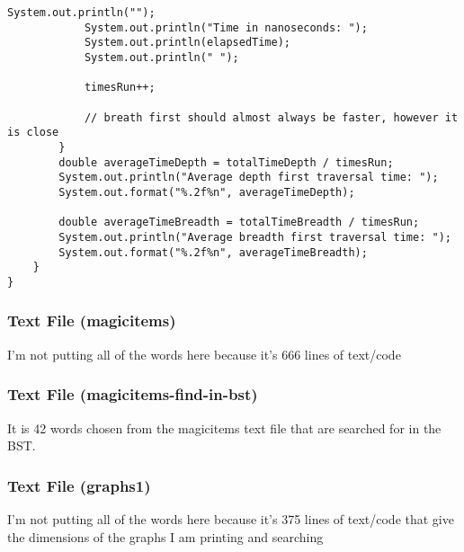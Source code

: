 \documentclass[10pt]{article}
\begin{document}
\begin{lstlisting}[frame=single, ]
            System.out.println("");
            System.out.println("Time in nanoseconds: ");
            System.out.println(elapsedTime);
            System.out.println(" ");

            timesRun++;

            // breath first should almost always be faster, however it is close
        }
        double averageTimeDepth = totalTimeDepth / timesRun;
        System.out.println("Average depth first traversal time: ");
        System.out.format("%.2f%n", averageTimeDepth);

        double averageTimeBreadth = totalTimeBreadth / timesRun;
        System.out.println("Average breadth first traversal time: ");
        System.out.format("%.2f%n", averageTimeBreadth);
    }
}
\end{lstlisting}


\subsubsection{Text File (magicitems)}
\lstset{numbers=left, numberstyle=\tiny, stepnumber=1, numbersep=5pt, basicstyle=\footnotesize\ttfamily}
I'm not putting all of the words here because it's 666 lines of text/code

\subsubsection{Text File (magicitems-find-in-bst)}
\lstset{numbers=left, numberstyle=\tiny, stepnumber=1, numbersep=5pt, basicstyle=\footnotesize\ttfamily}
It is 42 words chosen from the magicitems text file that are searched for in the BST.

\subsubsection{Text File (graphs1)}
\lstset{numbers=left, numberstyle=\tiny, stepnumber=1, numbersep=5pt, basicstyle=\footnotesize\ttfamily}
I'm not putting all of the words here because it's 375 lines of text/code that give the dimensions of the graphs I am printing and searching
\end{document}
